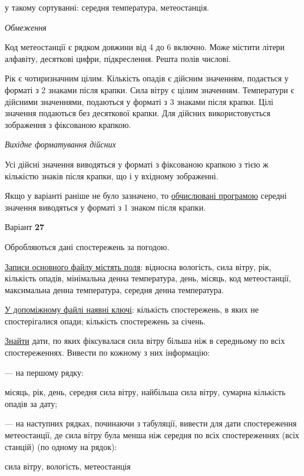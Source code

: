 \documentclass[11pt, ukrainian]{article}
\begin{document}
{\noindent}у такому сортуванні: середня температура, метеостанція.


\bigskip\textit{Обмеження}

Код метеостанції є рядком довжини від 4 до 6 включно.
Може містити літери алфавіту, десяткові цифри, підкреслення. Решта полів числові.

Рік є чотиризначним цілим.
Кількість опадів є дійсним значенням, подається у форматі з 2 знаками після крапки.
Сила вітру є цілим значенням.
Температури є дійсними значеннями, подаються у форматі з 3 знаками після крапки.
Цілі значення подаються без десяткової крапки.
Для дійсних використовується зображення з фіксованою крапкою.

\textit{Вихідне форматування дійсних}

Усі дійсні значення виводяться у форматі з фіксованою крапкою з тією ж кількістю знаків після крапки, що і у вхідному зображенні.

Якщо у варіанті раніше не було зазначено, то \underline{обчислювані програмою} середні значення виводяться у форматі з 1 знаком після крапки.


\par
\newpage
{\center Варіант  \No \textbf { 27 }\par}
\bigskip
Обробляються дані спостережень за погодою. 

\underline{Записи основного файлу містять поля}: відносна вологість, сила вітру, рік, кількість опадів, мінімальна денна температура, день, місяць, код метеостанції, максимальна денна температура, середня денна температура.

\underline{У допоміжному файлі наявні ключі}: кількість спостережень, в яких не спостерігалися опади; кількість спостережень за січень.

\underline{Знайти} дати, по яких фіксувалася сила вітру більша ніж в середньому по всіх спостереженнях. Вивести по кожному з них інформацію:\par
{\noindent}--- на першому рядку:\par
місяць, рік, день, середня сила вітру, найбільша сила вітру, сумарна кількість опадів за дату;

{\noindent}--- на наступних рядках, починаючи з табуляції, вивести для дати спостереження метеостанції, де сила вітру була менша ніж середня по всіх спостереженнях (всіх станцій) (по одному на рядок):\par
сила вітру, вологість, метеостанція
\end{document}
